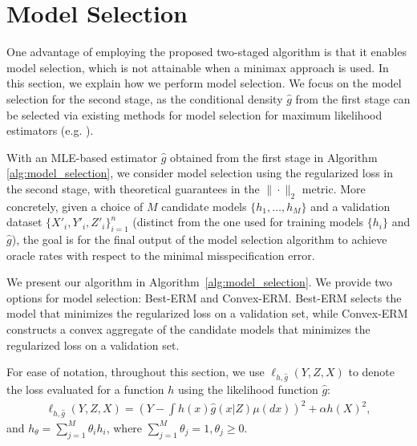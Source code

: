 \vspace{-2mm}
\section{Model Selection}\label{sec:model-selection}
\vspace{-2mm}

One advantage of employing the proposed two-staged algorithm is that it enables model selection, which is not attainable when a minimax approach is used. In this section, we explain how we perform model selection. We focus on the model selection for the second stage, as the conditional density $\hat{g}$ from the first stage can be selected via existing methods for model selection for maximum likelihood estimators (e.g. \cite{MLEselection,conditiondensitySelection,vijaykumar2021localization}). 

With an MLE-based estimator $\hat{g}$ obtained from the first stage in Algorithm \ref{alg:model_selection}, we consider model selection using the regularized loss in the second stage, with theoretical guarantees in the $\|\cdot\|_{2}$ metric. More concretely, given a choice of $M$ candidate models $\{h_1, \dots, h_M\}$ and a validation dataset $\{X'_i,Y'_i,Z'_i\}_{i=1}^n$ (distinct from the one used for training models $\{h_i\}$ and $\hat{g}$), the goal is for the final output of the model selection algorithm to achieve oracle rates with respect to the minimal misspecification error.


We present our algorithm in Algorithm~\ref{alg:model_selection}. We provide two options for model selection: Best-ERM and Convex-ERM. Best-ERM selects the model that minimizes the regularized loss on a validation set, while Convex-ERM constructs a convex aggregate of the candidate models that minimizes the regularized loss on a validation set.


\iffalse 
For ease of notation, throughout this section, we use $\ell_{h,\hat{g}}(Y,Z,X)$ to denote the loss evaluated for a function $h$ using the likelihood function $\hat{g}$: 
\begin{align*}
    \ell_{h,\hat{g}}(Y,Z,X) ={\left(Y - \int h(x)\hat{g}(x|Z)\mu(dx)\right)^2} + {\alpha h(X)^2},
\end{align*}
and $h_\theta = \sum_{j=1}^M \theta_i h_i$, where $\sum_{j=1}^M \theta_j =1, \theta_j\geq 0$.

